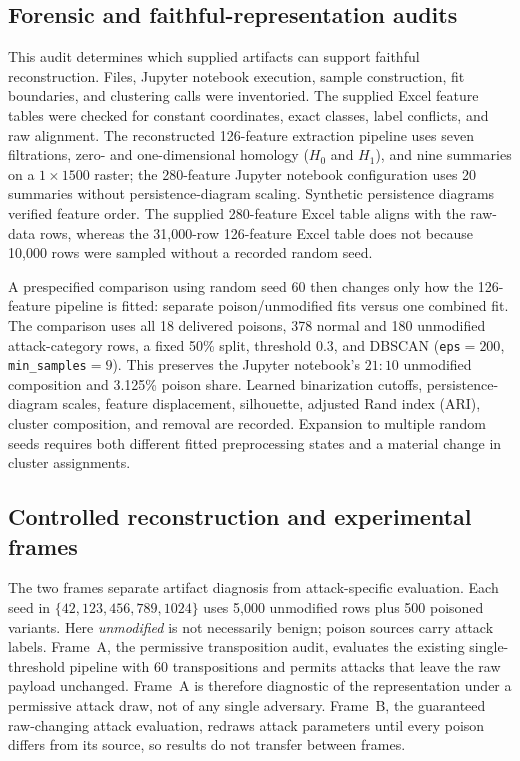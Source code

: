 \documentclass[conference]{IEEEtran}
\begin{document}
\subsection{Forensic and faithful-representation audits}
This audit determines which supplied artifacts can support faithful reconstruction.
Files, Jupyter notebook execution, sample construction, fit boundaries, and clustering
calls were inventoried. The supplied Excel feature tables were checked for
constant coordinates, exact classes, label conflicts, and raw alignment. The
reconstructed 126-feature extraction pipeline uses seven filtrations,
zero- and one-dimensional homology ($H_0$ and $H_1$), and nine summaries on a
$1\times1500$ raster; the 280-feature
Jupyter notebook configuration uses 20 summaries without persistence-diagram
scaling. Synthetic persistence diagrams verified feature order. The supplied 280-feature Excel table aligns
with the raw-data rows, whereas the 31,000-row 126-feature Excel table does not
because 10,000 rows were sampled without a recorded random seed.

A prespecified comparison using random seed 60 then changes only how the
126-feature pipeline is fitted: separate poison/unmodified fits versus one
combined fit. The comparison uses all 18 delivered poisons, 378 normal and 180
unmodified attack-category rows, a fixed 50\% split, threshold 0.3, and DBSCAN
(\texttt{eps}$=200$,
\texttt{min\_samples}$=9$). This preserves the Jupyter notebook's $21{:}10$
unmodified composition and 3.125\% poison share. Learned binarization cutoffs,
persistence-diagram scales, feature displacement, silhouette, adjusted Rand
index (ARI), cluster composition, and removal are recorded.
Expansion to multiple random seeds requires both different fitted preprocessing
states and a material change in cluster assignments.

\subsection{Controlled reconstruction and experimental frames}
The two frames separate artifact diagnosis from attack-specific evaluation.
Each seed in $\{42,123,456,789,1024\}$ uses 5,000 unmodified rows plus 500
poisoned variants. Here \emph{unmodified} is not necessarily benign; poison
sources carry attack labels. Frame~A, the permissive transposition audit,
evaluates the existing single-threshold pipeline with 60 transpositions and
permits attacks that leave the raw payload unchanged. Frame~A is therefore diagnostic of the
representation under a permissive attack draw, not of any single adversary.
Frame~B, the guaranteed raw-changing attack evaluation, redraws attack
parameters until every poison differs from its source, so results do not
transfer between frames.
\end{document}
